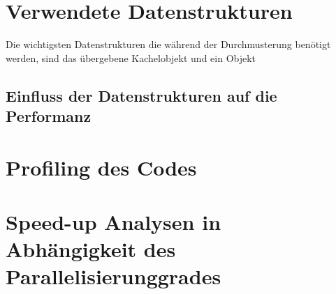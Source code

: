 \documentclass[10pt,a4paper]{report}
\begin{document}
\section{Verwendete Datenstrukturen}

Die wichtigsten Datenstrukturen die während der Durchmusterung benötigt werden, sind das übergebene Kachelobjekt und ein Objekt 

\subsection{Einfluss der Datenstrukturen auf die Performanz}

\section{Profiling des Codes}

\section{Speed-up Analysen in Abhängigkeit des Parallelisierunggrades}
\end{document}
